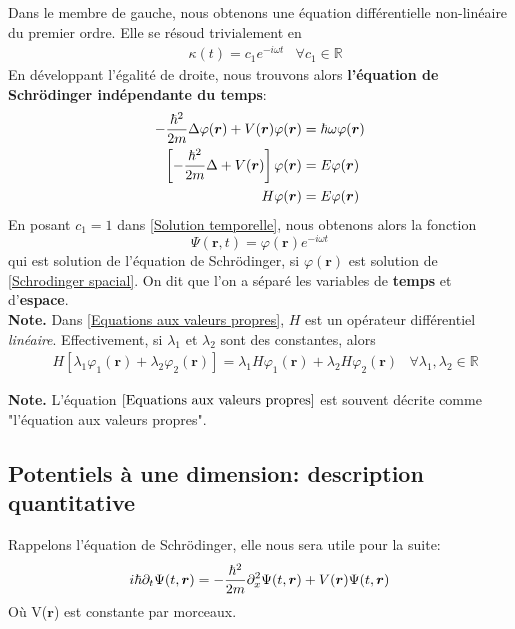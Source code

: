 \documentclass[../notesdecours]{subfiles}
\begin{document}
Dans le membre de gauche, nous obtenons une équation différentielle non-linéaire du premier ordre. Elle se résoud trivialement en
\begin{align}
&\kappa (t) = c_1e^{-i\omega t}    &\forall c_1 \in \mathbb{R}
\label{Solution temporelle}
\end{align}
En développant l'égalité de droite, nous trouvons alors \textbf{l'équation de Schrödinger indépendante du temps}:
\begin{align}
- \frac{\hbar^2}{2m} \Delta \varphi(\bm{r}) + V(\bm{r})\varphi(\bm{r}) &= \hbar\omega\varphi(\bm{r}) \label{Schrodinger spacial} \\
\left[ - \frac{\hbar^2}{2m} \Delta + V(\bm{r}) \right] \varphi(\bm{r}) &= E \varphi(\bm{r}) \label{Equations aux valeurs propres}\\
H \varphi(\bm{r}) &= E \varphi(\bm{r})  \label{kikoo}
\end{align}
En posant $c_1 = 1$ dans \eqref{Solution temporelle}, nous obtenons alors la fonction
\begin{equation}
\Psi (\bm{r},t) = \varphi(\bm{r})e^{-i\omega t}
\end{equation}
qui est solution de l'équation de Schrödinger, si $\varphi(\bm{r})$ est solution de \eqref{Schrodinger spacial}. On dit que l'on a séparé les variables de \textbf{temps} et d'\textbf{espace}.\\

\textbf{Note.} Dans \eqref{Equations aux valeurs propres}, $H$ est un opérateur différentiel \emph{linéaire}. Effectivement, si $\lambda_1$ et $\lambda_2$ sont des constantes, alors 
\begin{align}
&H \left[\lambda_1 \varphi_1(\bm{r}) + \lambda_2 \varphi_2(\bm{r})\right] = \lambda_1 H \varphi_1(\bm{r}) + \lambda_2 H \varphi_2(\bm{r})							&\forall \lambda_1,\lambda_2 \in \mathbb{R}
\end{align}

\textbf{Note.} L'équation $\eqref{Equations aux valeurs propres}$ est souvent décrite comme "l'équation aux valeurs propres".

\subsection{Potentiels à une dimension: description quantitative}

Rappelons l'équation de Schrödinger, elle nous sera utile pour la suite:
\begin{equation*}
i \hbar \partial_t \Psi (t,\bm{r}) = - \frac{\hbar^2}{2m} \partial_x^2 \Psi(t,\bm{r}) + V(\bm{r})\Psi(t,\bm{r})
\end{equation*}
Où V($\bm{r}$) est constante par morceaux.\\
\end{document}
